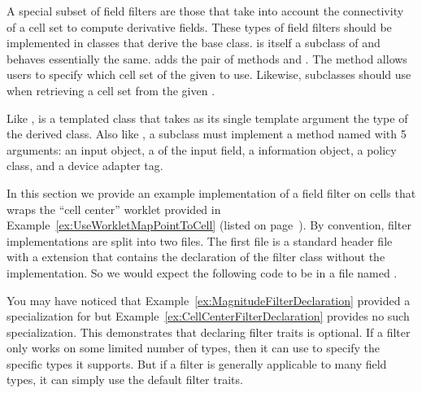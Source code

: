 A special subset of field filters are those that take into account the connectivity of a cell set to compute derivative fields.
These types of field filters should be implemented in classes that derive the  base class.
 is itself a subclass of  and behaves essentially the same.
 adds the pair of methods  and .
The  method allows users to specify which cell set of the given  to use.
Likewise,  subclasses should use  when retrieving a cell set from the given .

Like ,  is a templated class that takes as its single template argument the type of the derived class.
Also like , a  subclass must implement a method named  with 5 arguments: an input  object, a  of the input field, a  information object, a policy class, and a device adapter tag.

In this section we provide an example implementation of a field filter on cells that wraps the ``cell center'' worklet provided in Example~\ref{ex:UseWorkletMapPointToCell} (listed on page~\pageref{ex:UseWorkletMapPointToCell}).
By convention, filter implementations are split into two files.
The first file is a standard header file with a  extension that contains the declaration of the filter class without the implementation.
So we would expect the following code to be in a file named .


\begin{didyouknow}
    You may have noticed that Example~\ref{ex:MagnitudeFilterDeclaration} provided a specialization for  but Example~\ref{ex:CellCenterFilterDeclaration} provides no such specialization.
  This demonstrates that declaring filter traits is optional.
  If a filter only works on some limited number of types, then it can use  to specify the specific types it supports.
  But if a filter is generally applicable to many field types, it can simply use the default filter traits.
\end{didyouknow}

